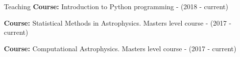 \begin{rubric}{Teaching}
\entry*[Lecturer]%
\textbf{Course:} Introduction to Python programming - (2018 - current) \par
{}%
\textbf{Course:} Statistical Methods in Astrophysics. Masters level course - (2017 - current) \par
{}%
\textbf{Course:} Computational Astrophysics. Masters level course - (2017 - current) \par

 \par

%
%
\end{rubric}